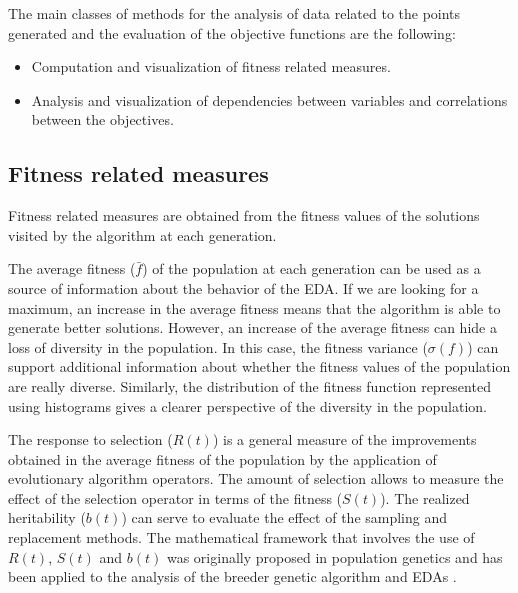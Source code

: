 \documentclass[a4paper]{article}
\begin{document}
The main classes of methods for the analysis of  data related to
the points generated and the evaluation of the objective functions are the following:

   \begin{itemize}
     \item Computation and visualization of fitness related measures.
     \item Analysis and visualization of dependencies between variables and correlations between the
     objectives.
   \end{itemize}


\subsection{Fitness related measures}


Fitness related measures are obtained from the fitness values of the
solutions visited by the algorithm at each generation.

The  average fitness ($\bar{f}$) of the population at each
generation can be used as a source of information about the behavior
of the EDA. If we are looking for a maximum, an increase in the average fitness means that the
algorithm is able to generate better solutions. However, an increase
of the average fitness can hide a loss of diversity in the
population. In this case, the fitness variance ($\sigma(f)$) can
support additional information about whether the fitness values of
the population are really diverse. Similarly, the distribution of
the fitness function represented using histograms gives a clearer
perspective of the diversity in the population.

The response to selection  ($R(t)$) is a general measure of the
improvements obtained in the average fitness of the population by
the application of evolutionary algorithm operators. The amount of selection allows
to measure the effect of the selection operator in terms of the
fitness ($S(t)$). The realized heritability ($b(t)$) can serve to
evaluate the effect of the sampling and replacement methods. The
mathematical framework that involves the use of $R(t)$, $S(t)$ and
$b(t)$ was originally proposed in population genetics and has been
applied  to the analysis of the breeder genetic algorithm
\cite{Muhlenbein_and_Voosen:1993a} and EDAs
\cite{Muhlenbein:1997,Santana:1999,Santana_et_al:2008c}.
\end{document}
